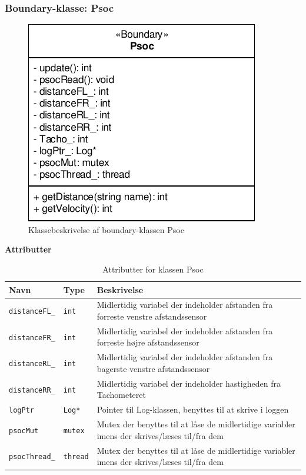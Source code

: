 \subsubsection{Boundary-klasse: Psoc}

\begin{figure}[h]
\centering
\includegraphics[]{../fig/diagrammer/bil/cd_psoc.pdf}
\caption{Klassebeskrivelse af boundary-klassen Psoc}
\label{fig:cd_psoc}
\end{figure}

\textbf{Attributter}

\begin{table}[h]
	\begin{tabularx}{\textwidth}{| Z | Z | L{10cm} |} \hline
	Navn & Type & Beskrivelse \\\hline
	\texttt{distanceFL\_}  & \texttt{int} 	& Midlertidig variabel der indeholder afstanden fra forreste venstre afstandssensor				\\\hline
	\texttt{distanceFR\_}  & \texttt{int} 	& Midlertidig variabel der indeholder afstanden fra forreste højre afstandssensor				\\\hline
	\texttt{distanceRL\_}  & \texttt{int} 	& Midlertidig variabel der indeholder afstanden fra bagerste venstre afstandssensor				\\\hline
	\texttt{distanceRR\_}  & \texttt{int} 	& Midlertidig variabel der indeholder hastigheden fra Tachometeret								\\\hline
	\texttt{logPtr} 	 & \texttt{Log*} 	& Pointer til Log-klassen, benyttes til at skrive i loggen										\\\hline
	\texttt{psocMut} 	 & \texttt{mutex} 	& Mutex der benyttes til at låse de midlertidige variabler imens der skrives/læses til/fra dem	\\\hline
	\texttt{psocThread\_} & \texttt{thread} 	& Mutex der benyttes til at låse de midlertidige variabler imens der skrives/læses til/fra dem	\\\hline
	\end{tabularx}
	\caption{Attributter for klassen Psoc}
	\label{table:attr_Psoc}
\end{table}
\clearpage

